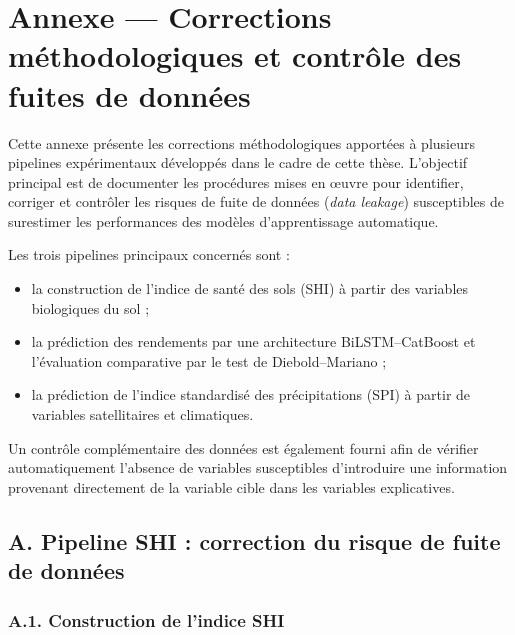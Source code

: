 
\chapter*{Annexe — Corrections méthodologiques et contrôle des fuites de données}

Cette annexe présente les corrections méthodologiques apportées à plusieurs
pipelines expérimentaux développés dans le cadre de cette thèse. L'objectif
principal est de documenter les procédures mises en œuvre pour identifier,
corriger et contrôler les risques de fuite de données (\textit{data leakage})
susceptibles de surestimer les performances des modèles d'apprentissage
automatique.

Les trois pipelines principaux concernés sont :

\begin{itemize}
    \item la construction de l'indice de santé des sols (SHI) à partir des
    variables biologiques du sol ;
    \item la prédiction des rendements par une architecture
    BiLSTM--CatBoost et l'évaluation comparative par le test de
    Diebold--Mariano ;
    \item la prédiction de l'indice standardisé des précipitations (SPI)
    à partir de variables satellitaires et climatiques.
\end{itemize}

Un contrôle complémentaire des données est également fourni afin de vérifier
automatiquement l'absence de variables susceptibles d'introduire une
information provenant directement de la variable cible dans les variables
explicatives.

\section*{A. Pipeline SHI : correction du risque de fuite de données}

\subsection*{A.1. Construction de l'indice SHI}

